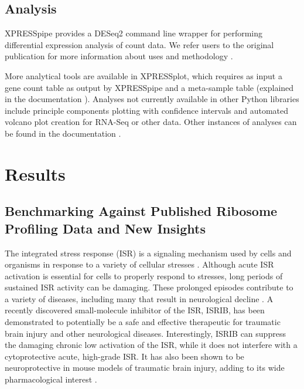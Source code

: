 \documentclass[10pt, oneside]{article}
\begin{document}
\subsection*{Analysis}
XPRESSpipe provides a DESeq2 command line wrapper for performing differential expression analysis of count data. We refer users to the original publication for more information about uses and methodology \cite{deseq2}. \par

More analytical tools are available in XPRESSplot, which requires as input a gene count table as output by XPRESSpipe and a meta-sample table (explained in the documentation \cite{xpressplot_docs}). Analyses not currently available in other Python libraries include principle components plotting with confidence intervals and automated volcano plot creation for RNA-Seq or other data. Other instances of analyses can be found in the documentation \cite{xpressplot_docs}. \\

\section*{Results}
\subsection*{Benchmarking Against Published Ribosome Profiling Data and New Insights}
The integrated stress response (ISR) is a signaling mechanism used by cells and organisms in response to a variety of cellular stresses \cite{harding_isr}. Although acute ISR activation is essential for cells to properly respond to stresses, long periods of sustained ISR activity can be damaging. These prolonged episodes contribute to a variety of diseases, including many that result in neurological decline \cite{isr_disease}. A recently discovered small-molecule inhibitor of the ISR, ISRIB, has been demonstrated to potentially be a safe and effective therapeutic for traumatic brain injury and other neurological diseases. Interestingly, ISRIB can suppress the damaging chronic low activation of the ISR, while it does not interfere with a cytoprotective acute, high-grade ISR. It has also been shown to be neuroprotective in mouse models of traumatic brain injury, adding to its wide pharmacological interest \cite{isrib_activation, isrib_structure, isrib_riboseq, isrib_neuroprotective, isrib_neuroprotective2, isrib_neuroprotective3, isrib_neuroprotective4}. \par
\end{document}
